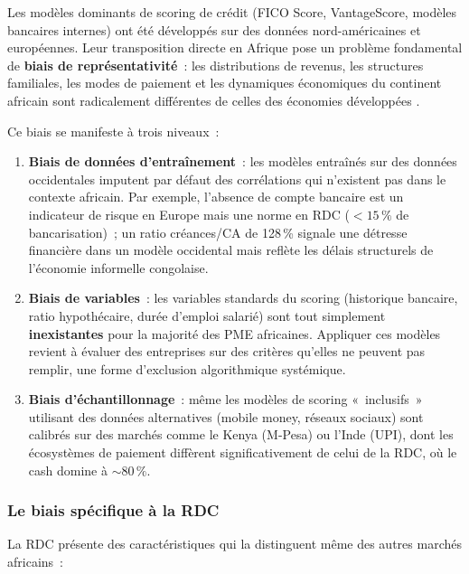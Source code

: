 \documentclass[12pt, a4paper, twocolumn]{article}
\begin{document}
Les modèles dominants de scoring de crédit (FICO Score, VantageScore, modèles bancaires internes) ont été développés sur des données nord-américaines et européennes. Leur transposition directe en Afrique pose un problème fondamental de \textbf{biais de représentativité}~: les distributions de revenus, les structures familiales, les modes de paiement et les dynamiques économiques du continent africain sont radicalement différentes de celles des économies développées \cite{bjorkegren2020, kshetri2021}.

Ce biais se manifeste à trois niveaux~:

\begin{enumerate}[leftmargin=*]
  \item \textbf{Biais de données d'entraînement}~: les modèles entraînés sur des données occidentales imputent par défaut des corrélations qui n'existent pas dans le contexte africain. Par exemple, l'absence de compte bancaire est un indicateur de risque en Europe mais une norme en RDC ($<15\,\%$ de bancarisation)~; un ratio créances/CA de 128\,\% signale une détresse financière dans un modèle occidental mais reflète les délais structurels de l'économie informelle congolaise.
  \item \textbf{Biais de variables}~: les variables standards du scoring (historique bancaire, ratio hypothécaire, durée d'emploi salarié) sont tout simplement \textbf{inexistantes} pour la majorité des PME africaines. Appliquer ces modèles revient à évaluer des entreprises sur des critères qu'elles ne peuvent pas remplir, une forme d'exclusion algorithmique systémique.
  \item \textbf{Biais d'échantillonnage}~: même les modèles de scoring «~inclusifs~» utilisant des données alternatives (mobile money, réseaux sociaux) sont calibrés sur des marchés comme le Kenya (M-Pesa) ou l'Inde (UPI), dont les écosystèmes de paiement diffèrent significativement de celui de la RDC, où le cash domine à ${\sim}80\,\%$.
\end{enumerate}

\subsubsection{Le biais spécifique à la RDC}
\label{subsubsec:biais_rdc}

La RDC présente des caractéristiques qui la distinguent même des autres marchés africains~:
\end{document}
